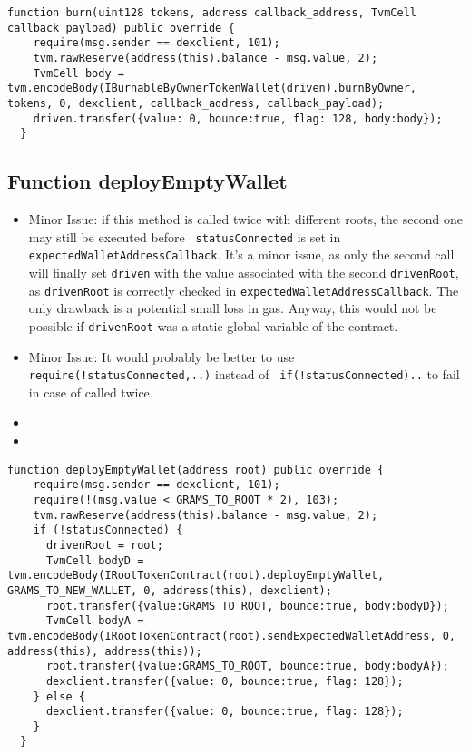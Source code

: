 \begin{lstlisting}[firstnumber=116]
  function burn(uint128 tokens, address callback_address, TvmCell callback_payload) public override {
    require(msg.sender == dexclient, 101);
    tvm.rawReserve(address(this).balance - msg.value, 2);
    TvmCell body = tvm.encodeBody(IBurnableByOwnerTokenWallet(driven).burnByOwner, tokens, 0, dexclient, callback_address, callback_payload);
    driven.transfer({value: 0, bounce:true, flag: 128, body:body});
  }
\end{lstlisting}

\subsection{Function deployEmptyWallet}

\begin{itemize}
\item Minor Issue: if this method is called twice with different
  roots, the second one may still be executed before {\tt
    statusConnected} is set in {\tt
    expectedWalletAddressCallback}. It's a minor issue, as only the
  second call will finally set {\tt driven} with the value associated
  with the second {\tt drivenRoot}, as {\tt drivenRoot} is correctly
  checked in {\tt expectedWalletAddressCallback}. The only drawback is
  a potential small loss in gas. Anyway, this would not be possible if
  {\tt drivenRoot} was a static global variable of the contract.
\item Minor Issue: It would probably be better to use {\tt
  require(!statusConnected,..)} instead of {\tt
  if(!statusConnected){..}} to fail in case of called twice.
\item \issueError{}
\item \issueEncodeBody{}
\end{itemize}


\begin{lstlisting}[firstnumber=60]
  function deployEmptyWallet(address root) public override {
    require(msg.sender == dexclient, 101);
    require(!(msg.value < GRAMS_TO_ROOT * 2), 103);
    tvm.rawReserve(address(this).balance - msg.value, 2);
    if (!statusConnected) {
      drivenRoot = root;
      TvmCell bodyD = tvm.encodeBody(IRootTokenContract(root).deployEmptyWallet, GRAMS_TO_NEW_WALLET, 0, address(this), dexclient);
      root.transfer({value:GRAMS_TO_ROOT, bounce:true, body:bodyD});
      TvmCell bodyA = tvm.encodeBody(IRootTokenContract(root).sendExpectedWalletAddress, 0, address(this), address(this));
      root.transfer({value:GRAMS_TO_ROOT, bounce:true, body:bodyA});
      dexclient.transfer({value: 0, bounce:true, flag: 128});
    } else {
      dexclient.transfer({value: 0, bounce:true, flag: 128});
    }
  }
\end{lstlisting}

